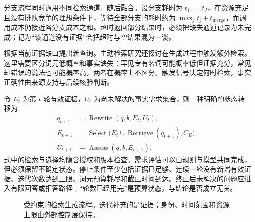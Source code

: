 \documentclass[../textbook.tex]{subfiles}
\begin{document}
分支流程同时调用不同检索通道，随后融合。设分支耗时为 $t_1,\ldots,t_J$，在资源充足且没有排队竞争的理想条件下，等待全部分支的耗时约为 $\max_jt_j+t_{\mathrm{merge}}$，而调用成本仍接近各分支成本之和。超时返回部分结果时，必须把缺失通道记录为未完成；记为“该通道没有证据”会把超时与空结果混为一谈。

根据当前证据缺口提出新查询。主动检索研究还探讨在生成过程中触发额外检索\cite{jiang2023activerag}。这里需要区分词元低概率和事实缺失：罕见专有名词可能概率低但证据充分，常见却错误的说法也可能概率高，两者在概率上不区分。触发信号决定何时检索，事实正确性由来源支持与后续核验判断。

令 $E_t$ 为第 $t$ 轮有效证据，$U_t$ 为尚未解决的事实需求集合，则一种明确的状态转移为
\begin{align}
 q_{t+1}&=\operatorname{Rewrite}(q,b,E_t,U_t),\\
 E_{t+1}&=\operatorname{Select}\bigl(E_t\cup\operatorname{Retrieve}(q_{t+1}),C_E\bigr),\\
 U_{t+1}&=\operatorname{Assess}(q,b,E_{t+1}).
\end{align}
式中的检索与选择均隐含授权和版本检查。需求评估可以由规则与模型共同完成，但必须保留不确定状态。停止条件至少包括证据已足够、连续一轮没有新增有效证据、迭代次数达到上限、词元预算耗尽和截止时间到达。终止后未解决的问题应进入有限回答或拒答路径；“轮数已经用完”是预算状态，与结论是否成立无关。

\begin{figure}[htbp]
\centering
{}
\caption[受约束的检索生成流程]{受约束的检索生成流程。迭代补充的是证据；身份、时间范围和资源上限由外部控制层保持。}\label{fig:rag-query-flow}
\end{figure}
\end{document}
